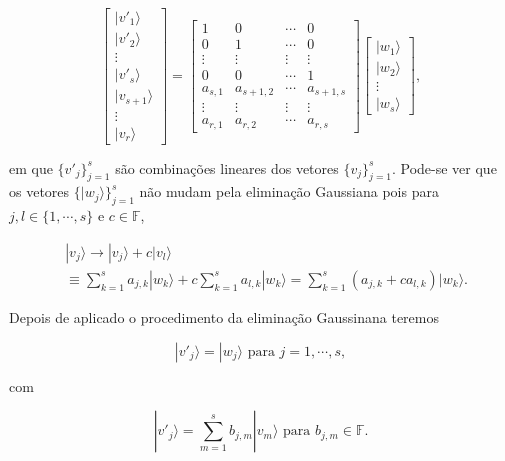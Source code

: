 \documentclass[11pt]{article}
\begin{document}
\begin{equation}
\begin{bmatrix} |v'_{1}\rangle \\ |v'_{2}\rangle \\ \vdots \\ |v'_{s}\rangle \\ |v_{s+1}\rangle \\ \vdots \\ |v_{r}\rangle \end{bmatrix}
=\begin{bmatrix} 1 & 0 & \cdots & 0 \\  0 & 1 & \cdots & 0 \\  \vdots & \vdots & \vdots & \vdots \\ 0 & 0 & \cdots & 1 \\ a_{s,1} & a_{s+1,2} & \cdots & a_{s+1,s} \\  \vdots & \vdots & \vdots & \vdots  \\ a_{r,1} & a_{r,2} & \cdots & a_{r,s} \end{bmatrix}\begin{bmatrix} |w_{1}\rangle \\ |w_{2}\rangle \\ \vdots \\ |w_{s}\rangle \end{bmatrix},
\end{equation}

em que \(\{v'_{j}\}_{j=1}^{s}\) são combinações lineares dos vetores
\(\{v_{j}\}_{j=1}^{s}\). Pode-se ver que os vetores
\(\{|w_{j}\rangle\}_{j=1}^{s}\) não mudam pela eliminação Gaussiana pois
para \(j,l\in\{1,\cdots,s\}\) e \(c\in\mathbb{F}\),

\begin{align}
& |v_{j}\rangle\rightarrow|v_{j}\rangle+c|v_{l}\rangle \\
& \equiv \sum_{k=1}^{s}a_{j,k}|w_{k}\rangle +c  \sum_{k=1}^{s}a_{l,k}|w_{k}\rangle=\sum_{k=1}^{s}(a_{j,k}+ca_{l,k})|w_{k}\rangle. 
\end{align}

Depois de aplicado o procedimento da eliminação Gaussinana teremos

\begin{equation}
|v'_{j}\rangle=|w_{j}\rangle\text{ para } j=1,\cdots,s,
\end{equation}

com

\begin{equation}
|v'_{j}\rangle=\sum_{m=1}^{s}b_{j,m}|v_{m}\rangle\text{ para } b_{j,m}\in\mathbb{F}.
\end{equation}
\end{document}
